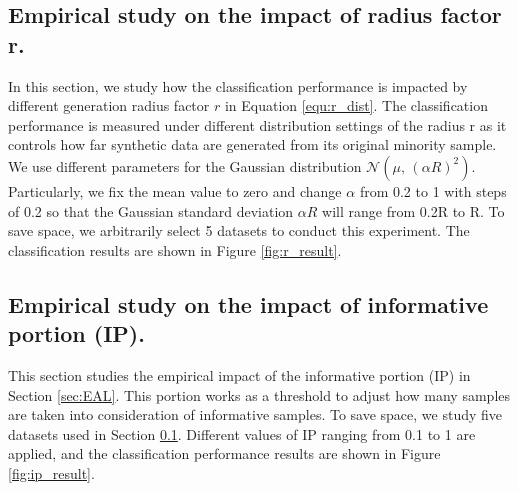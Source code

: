 \subsection{Empirical study on the impact of radius factor r.}
\label{sec:simpor_r_distribution_impact}
In this section, we study how the classification performance is impacted by different generation radius factor $r$ in Equation \ref{equ:r_dist}. The classification performance is measured under different distribution settings of the radius r as it controls how far synthetic data are generated from its original minority sample. We use different parameters for the Gaussian distribution $\mathcal{N}(\mu ,\,{(\alpha R)}^{2})$. Particularly, we fix the mean value to zero and change $\alpha$ from 0.2 to 1 with steps of 0.2 so that the Gaussian standard deviation $\alpha R$ will range from 0.2R to R. To save space, we arbitrarily select 5 datasets to conduct this experiment. The classification results are shown in Figure \ref{fig:r_result}. 

\subsection{Empirical study on the impact of informative portion (IP).}
This section studies the empirical impact of the informative portion (IP) in Section \ref{sec:EAL}. This portion works as a threshold to adjust how many samples are taken into consideration of informative samples. To save space, we study five datasets used in Section \ref{sec:simpor_r_distribution_impact}. Different values of IP ranging from 0.1 to 1 are applied, and the classification performance results are shown in Figure \ref{fig:ip_result}.

